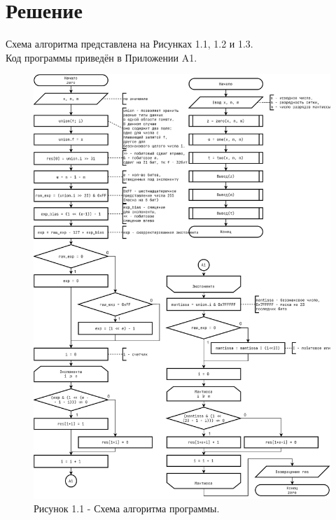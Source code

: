\documentclass[oneside,a4paper,14pt]{extarticle}
\begin{document}
\section*{Решение}
\noindent Схема алгоритма представлена на Рисунках 1.1, 1.2 и 1.3. \\
\noindent Код программы приведён в Приложении A1.\\
\begin{figure}[h!]
	\centering
    \includegraphics[height=0.75\textheight]{pics/5_flowchart_p1.png}
	\caption*{Рисунок 1.1 - Схема алгоритма программы.}
\end{figure}
\end{document}
